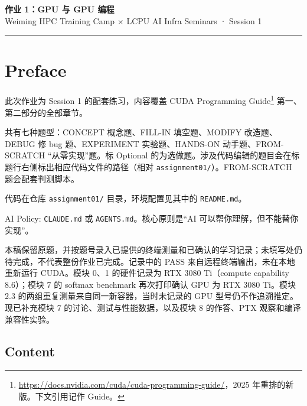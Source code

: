\documentclass[11pt,a4paper,fontset=none]{ctexart}
\newcommand{\guide}{CUDA Programming Guide}
\begin{document}
\begin{center}
  {\LARGE\bfseries 作业 1：GPU 与 GPU 编程}\\[6pt]
  {\sffamily Weiming HPC Training Camp $\times$ LCPU AI Infra Seminars \; · \; Session 1}
\end{center}

\vspace{0.5em}
\hrule
\vspace{1em}

\section*{Preface}

此次作业为 Session 1 的配套练习，内容覆盖 \guide{}\footnote{\url{https://docs.nvidia.com/cuda/cuda-programming-guide/}，2025 年重排的新版。下文引用记作 Guide。} 第一、第二部分的全部章节。

共有七种题型：CONCEPT 概念题、FILL-IN 填空题、MODIFY 改造题、DEBUG 修 bug 题、EXPERIMENT 实验题、HANDS-ON 动手题、FROM-SCRATCH “从零实现”题。标 Optional 的为选做题。涉及代码编辑的题目会在标题行右侧标出相应代码文件的路径（相对 \texttt{assignment01/}）。FROM-SCRATCH 题会配套判测脚本。

代码在仓库 \texttt{assignment01/} 目录，环境配置见其中的 \texttt{README.md}。

AI Policy: \texttt{CLAUDE.md} 或 \texttt{AGENTS.md}。核心原则是“AI 可以帮你理解，但不能替你实现”。

\begin{tcolorbox}[colback=blue!3,colframe=accent,title={个人实验记录（整理至 2026-09-11）}]
本稿保留原题，并按题号录入已提供的终端测量和已确认的学习记录；未填写处仍待完成，不代表整份作业已完成。记录中的 PASS 来自远程终端输出，未在本地重新运行 CUDA。模块 0、1 的硬件记录为 RTX 3080 Ti（compute capability 8.6）；模块 7 的 softmax benchmark 再次打印确认 GPU 为 RTX 3080 Ti。模块 2.3 的两组重复测量来自同一新容器，当时未记录的 GPU 型号仍不作追溯推定。现已补充模块 7 的讨论、测试与性能数据，以及模块 8 的作答、PTX 观察和编译兼容性实验。
\end{tcolorbox}

\subsection*{Content}
\end{document}
